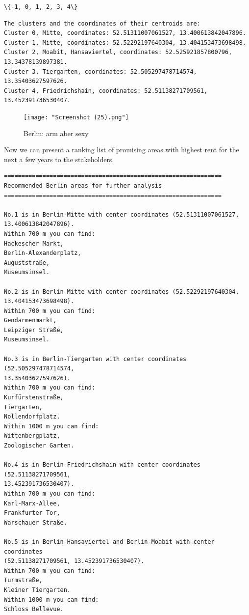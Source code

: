\documentclass[11pt]{article}
\makeatletter
\newcommand{\boxspacing}{\kern\kvtcb@left@rule\kern\kvtcb@boxsep}
\newcommand{\prompt}[4]{
        {\ttfamily\llap{{\color{#2}[#3]:\hspace{3pt}#4}}\vspace{-\baselineskip}}
    }
\makeatother
\begin{document}
            \begin{tcolorbox}[breakable, size=fbox, boxrule=.5pt, pad at break*=1mm, opacityfill=0]
\begin{Verbatim}[commandchars=\\\{\}]
\{-1, 0, 1, 2, 3, 4\}
\end{Verbatim}
\end{tcolorbox}


    \begin{Verbatim}[commandchars=\\\{\}]
The clusters and the coordinates of their centroids are:
Cluster 0, Mitte, coordinates: 52.51311007061527, 13.400613842047896.
Cluster 1, Mitte, coordinates: 52.52292197640304, 13.404153473698498.
Cluster 2, Moabit, Hansaviertel, coordinates: 52.525921857800796,
13.34378139897381.
Cluster 3, Tiergarten, coordinates: 52.505297478714574, 13.35403627597626.
Cluster 4, Friedrichshain, coordinates: 52.51138271709561, 13.452391736530407.
    \end{Verbatim}

                            \begin{figure}
\centering
\texttt{[image: "Screenshot (25).png"]}
\caption{Berlin: arm aber sexy}
\end{figure}


        
    Now we can present a ranking list of promising areas with highest rent
for the next a few years to the stakeholders.

    

    \begin{Verbatim}[commandchars=\\\{\}]
==============================================================
Recommended Berlin areas for further analysis
==============================================================

No.1 is in Berlin-Mitte with center coordinates (52.51311007061527,
13.400613842047896).
Within 700 m you can find:
Hackescher Markt,
Berlin-Alexanderplatz,
Auguststraße,
Museumsinsel.

No.2 is in Berlin-Mitte with center coordinates (52.52292197640304,
13.404153473698498).
Within 700 m you can find:
Gendarmenmarkt,
Leipziger Straße,
Museumsinsel.

No.3 is in Berlin-Tiergarten with center coordinates (52.505297478714574,
13.35403627597626).
Within 700 m you can find:
Kurfürstenstraße,
Tiergarten,
Nollendorfplatz.
Within 1000 m you can find:
Wittenbergplatz,
Zoologischer Garten.

No.4 is in Berlin-Friedrichshain with center coordinates (52.51138271709561,
13.452391736530407).
Within 700 m you can find:
Karl-Marx-Allee,
Frankfurter Tor,
Warschauer Straße.

No.5 is in Berlin-Hansaviertel and Berlin-Moabit with center coordinates
(52.51138271709561, 13.452391736530407).
Within 700 m you can find:
Turmstraße,
Kleiner Tiergarten.
Within 1000 m you can find:
Schloss Bellevue.

    \end{Verbatim}
\end{document}
